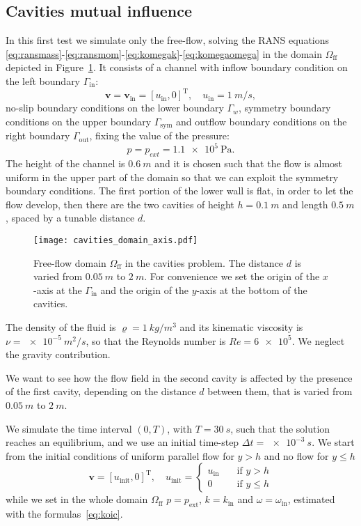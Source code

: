 \subsection{Cavities mutual influence}
In this first test we simulate only the free-flow, solving the RANS equations  \eqref{eq:ransmass}-\eqref{eq:ransmom}-\eqref{eq:komegak}-\eqref{eq:komegaomega} in the domain $\Omega_\text{ff}$ depicted in Figure~\ref{fig:singledomain}. It consists of a channel with inflow boundary 
condition on the left boundary $\Gamma_\text{in}$:
\begin{equation}
	\mathbf{v} = \mathbf{v}_\text{in} = [u_\text{in}, 0]^\mathrm{T}, \quad u_\text{in} = \SI{1}{m/s},
\end{equation}
no-slip boundary conditions on the lower boundary $\Gamma_w$, symmetry boundary conditions on the upper boundary $\Gamma_\text{sym}$ and outflow boundary conditions on the right boundary $\Gamma_\text{out}$, fixing the value of the pressure:
\begin{equation}
	p = p_{ext} = \SI{1.1e5}{\pascal}.
\end{equation}
The height of the channel is $\SI{0.6}{m}$ and it is chosen such that the flow is almost uniform in the upper part of the domain so that we can exploit the symmetry boundary conditions. The first portion of the lower wall is flat, in order to let the flow develop, then there are the two cavities of height $h=\SI{0.1}{m}$ and length $\SI{0.5}{m}$, spaced by a tunable distance $d$.
\begin{figure}[h]
	\centering
	\texttt{[image: cavities\_domain\_axis.pdf]}
	\caption[Free-flow domain $\Omega_\text{ff}$ in the cavities problem]{Free-flow domain $\Omega_\text{ff}$ in the cavities problem. The distance $d$ is varied from $\SI{0.05}{m}$ to $\SI{2}{m}$. For convenience we set the origin of the $x$-axis at the $\Gamma_\text{in}$ and the origin of the $y$-axis at the bottom of the cavities.}
	\label{fig:singledomain}
\end{figure}
The density of the fluid is $\varrho = \SI{1}{kg/m^3}$ and its kinematic viscosity is $\nu=\SI{e-5}{m^2/s}$, so that the Reynolds number is $Re=\num{6e5}$. We neglect the gravity contribution.

We want to see how the flow field in the second cavity is affected by the 
presence of the first cavity, depending on the distance $d$ between them, that 
is varied from $\SI{0.05}{m}$ to $\SI{2}{m}$.

We simulate the time interval $(0, T)$, with $T=\SI{30}{s}$, such that the solution reaches an equilibrium, and we use an initial time-step $\Delta t = \SI{e-3}{s}$. We start from the initial 
conditions of uniform parallel flow for $y>h$ and no flow for $y\leq h$
\begin{equation}
	\mathbf{v} = [u_\text{init},0]^\mathrm{T}, \quad u_\text{init} =
	\begin{cases}
	u_\text{in} \quad&\text{if $y>h$}\\
	0 \quad&\text{if $y\leq h$}
	\end{cases}
\end{equation}
while we set in the whole domain $\Omega_\text{ff}$ $p=p_\text{ext}$, $k=k_\text{in}$ and $\omega=\omega_\text{in}$, estimated with the formulas~\eqref{eq:koic}.

